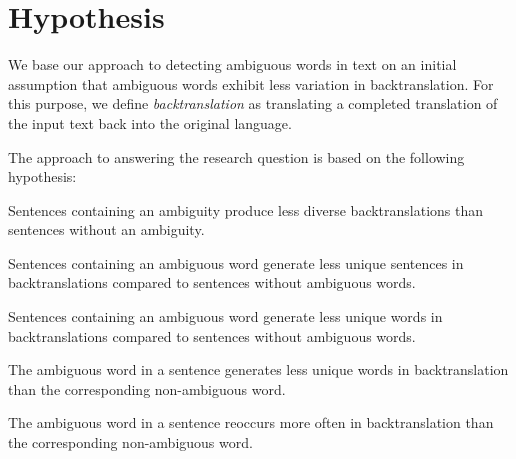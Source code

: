 \section{Hypothesis}
\label{sec:Methodology:Hypothesis}
We base our approach to detecting ambiguous words in text on an initial assumption that ambiguous words exhibit less variation in backtranslation.  For this purpose, we define \textit{backtranslation} as translating a completed translation of the input text back into the original language.  

The approach to answering the research question is based on the following hypothesis:

\begin{hyp}\label{main}
Sentences containing an ambiguity produce less diverse backtranslations than sentences without an ambiguity.
\end{hyp}

\setcounter{subhyp}{0}


\begin{subhyp}[a]\label{a}
Sentences containing an ambiguous word generate less unique sentences in backtranslations compared to sentences without ambiguous words.
\end{subhyp}

\begin{subhyp}[b]\label{b}
Sentences containing an ambiguous word generate less unique words in backtranslations compared to sentences without ambiguous words.
\end{subhyp}

\begin{subhyp}[c]\label{c}
The ambiguous word in a sentence generates less unique words in backtranslation than the corresponding non-ambiguous word.
\end{subhyp}

\begin{subhyp}[d]\label{d}
The ambiguous word in a sentence reoccurs more often in backtranslation than the corresponding non-ambiguous word.
\end{subhyp}



